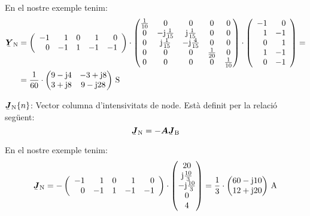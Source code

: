 \begin{list}{}
   En el nostre exemple tenim:
   \[ \begin{split}
      \mcmplx{Y}\ped{N} &=
      \left(\begin{array}{rrrrr} -1 & 1  & 0 &  1 & 0 \\  0 & -1 & 1 & -1 & -1
      \end{array}\right) \cdot
      \begin{pmatrix}
            \frac{1}{10} & 0 & 0 & 0 & 0 \\
            0 & -\ju\frac{1}{15} & \ju\frac{1}{15} & 0 & 0 \\
            0 & \ju\frac{1}{15} & -\ju\frac{4}{15} & 0 & 0 \\
            0 & 0 & 0 & \frac{1}{20} & 0 \\
            0 & 0 & 0 & 0 & \frac{1}{10}
      \end{pmatrix} \cdot
      \left(\begin{array}{rr} -1 & 0 \\ 1  & -1 \\  0 & 1 \\ 1 & -1 \\ 0 & -1
      \end{array}\right) = \\
       &=
      \frac{1}{60} \cdot \begin{pmatrix}
            9 - \ju 4 & -3 + \ju 8 \\
            3 + \ju 8 & 9 - \ju 28
      \end{pmatrix}\unit{S}
   \end{split}  \label{eq:yn}
   \]

   \item[$\mcmplx{J}\ped{N}\{n\}$:] Vector columna d'intensivitats de node. Est\`{a} definit per la relaci\'{o} seg\"{u}ent:
   \begin{equation}
      \mcmplx{J}\ped{N} = - \boldsymbol{A} \mcmplx{J}\ped{B}
   \end{equation}

   En el nostre exemple tenim:
   \[
      \mcmplx{J}\ped{N} = -
      \left(\begin{array}{rrrrr} -1 & 1  & 0 &  1 & 0 \\  0 & -1 & 1 & -1 & -1
      \end{array}\right) \cdot
      \begin{pmatrix} 20 \\ \ju\frac{10}{3} \\ -\ju\frac{10}{3} \\ 0 \\ 4 \end{pmatrix}
      =
      \frac{1}{3} \cdot \begin{pmatrix}
            60 - \ju 10 \\
            12 + \ju 20
      \end{pmatrix}\unit{A}
   \]


\end{list}
